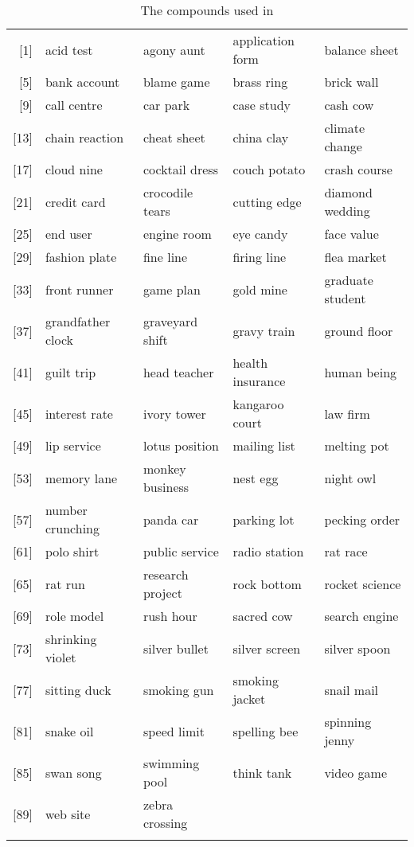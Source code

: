 \begin{table}[!htb]
\small
  \centering
  \begin{tabularx}{1\textwidth}{rllll}\lsptoprule
{}[1]&acid test       & agony aunt      & application form& balance sheet    \\{}
[5]&bank account     &blame game       &brass ring       &brick wall       \\{}
[9]&call centre      &car park         &case study       &cash cow         \\{}
[13]&chain reaction   &cheat sheet      &china clay       &climate change   \\{}
[17]&cloud nine       &cocktail dress   &couch potato     &crash course     \\{}
[21]&credit card      &crocodile tears  &cutting edge     &diamond wedding  \\{}
[25]&end user         &engine room      &eye candy        &face value       \\{}
[29]&fashion plate    &fine line        &firing line      &flea market      \\{}
[33]&front runner     &game plan        &gold mine        &graduate student \\{}
[37]&grandfather clock&graveyard shift  &gravy train      &ground floor     \\{}
[41]&guilt trip       &head teacher     &health insurance &human being      \\{}
[45]&interest rate    &ivory tower      &kangaroo court   &law firm         \\{}
[49]&lip service      &lotus position   &mailing list     &melting pot      \\{}
[53]&memory lane      &monkey business  &nest egg         &night owl        \\{}
[57]&number crunching &panda car        &parking lot      &pecking order    \\{}
[61]&polo shirt       &public service   &radio station    &rat race         \\{}
[65]&rat run          &research project &rock bottom      &rocket science   \\{}
[69]&role model       &rush hour        &sacred cow       &search engine    \\{}
[73]&shrinking violet &silver bullet    &silver screen    &silver spoon     \\{}
[77]&sitting duck     &smoking gun      &smoking jacket   &snail mail\\       {}
[81]&snake oil        &speed limit      &spelling bee     &spinning jenny\\   {}
[85]&swan song        &swimming pool    &think tank       &video game      \\ {}
[89]&web site        & zebra crossing  &&\\\lspbottomrule
   
  \end{tabularx}

  \caption{The compounds used in \citet{Reddyetal:2011}}
  \label{tab:reddy-items}
\end{table}

